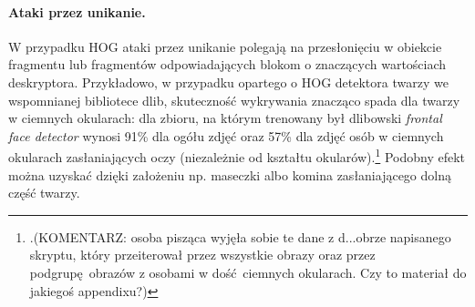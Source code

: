 \documentclass[12pt,a4paper,leqno,oneside,titlepage]{book}
\begin{document}
\paragraph{Ataki przez unikanie.}
W przypadku HOG ataki przez unikanie polegają na przesłonięciu w obiekcie fragmentu lub fragmentów odpowiadających blokom o znaczących wartościach deskryptora. Przykładowo, w przypadku opartego o HOG detektora twarzy we wspomnianej bibliotece dlib, skuteczność wykrywania znacząco spada dla twarzy w ciemnych okularach: dla zbioru, na którym trenowany był dlibowski \textit{frontal face detector} wynosi 91\% dla ogółu zdjęć oraz 57\% dla zdjęć osób w ciemnych okularach zasłaniających oczy (niezależnie od kształtu okularów).\footnote{.(KOMENTARZ: osoba pisząca wyjęła sobie te dane z d...obrze napisanego skryptu, który przeiterował przez wszystkie obrazy oraz przez podgrupę obrazów z osobami w dość ciemnych okularach. Czy to materiał do jakiegoś appendixu?) } Podobny efekt można uzyskać dzięki założeniu np. maseczki albo komina zasłaniającego dolną część twarzy\cite{dlibPage, MacDonald19}.
\end{document}
